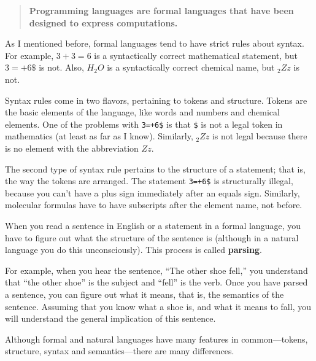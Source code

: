 \begin{quote}
{\bf Programming languages are formal languages that have been
designed to express computations.}
\end{quote}

As I mentioned before, formal languages tend to have strict rules
about syntax.  For example, $3+3=6$ is a syntactically correct
mathematical statement, but $3=+6\$$ is not.  Also, $H_2O$ is a
syntactically correct chemical name, but $_2Zz$ is not.

Syntax rules come in two flavors, pertaining to tokens and structure.
Tokens are the basic elements of the language, like words and numbers
and chemical elements.  One of the problems with {\tt 3=+6\$} is that
{\tt \$} is not a legal token in mathematics (at least as far as I
know).  Similarly, $_2Zz$ is not legal because there is no element with
the abbreviation $Zz$.

The second type of syntax rule pertains to the structure of a
statement; that is, the way the tokens are arranged.  The statement
{\tt 3=+6\$} is structurally illegal, because you can't have a plus
sign immediately after an equals sign.  Similarly, molecular formulas
have to have subscripts after the element name, not before.

When you read a sentence in English or a statement in a formal
language, you have to figure out what the structure of the sentence is
(although in a natural language you do this unconsciously).  This
process is called {\bf parsing}.


For example, when you hear the sentence, ``The other shoe fell,'' you
understand that ``the other shoe'' is the subject and ``fell'' is the
verb.  Once you have parsed a sentence, you can figure out what it
means, that is, the semantics of the sentence.  Assuming that you know
what a shoe is, and what it means to fall, you will understand the
general implication of this sentence.

Although formal and natural languages have many features in
common---tokens, structure, syntax and semantics---there are many
differences.



